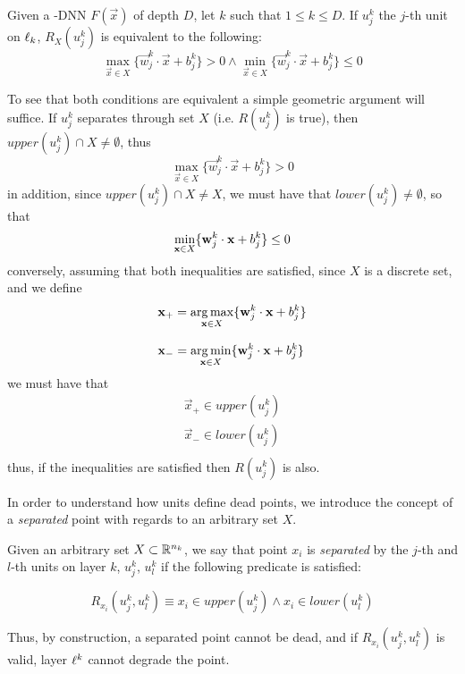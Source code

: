 \begin{remark}\label{rmk:separationUsingGeometry}
Given a \ReLU-DNN $F(\vec{x})$ of depth $D$, let $k$ such that $1\leq k \leq D$. If $u_j^k$ the $j$-th unit on $\layer_k$, $R_X(u_j^k)$ is equivalent to the following:
\begin{equation}
\displaystyle\max_{\vec{x}\in X}\{\vec{w}_j^k\cdot\vec{x}+b_j^k\} > 0
\wedge 
\displaystyle\min_{\vec{x}\in X}\{\vec{w}_j^k\cdot\vec{x}+b_j^k\} \leq 0
\end{equation}
\end{remark}
To see that both conditions are equivalent a simple geometric argument will suffice. If $u_j^k$ separates through set $X$ (i.e. $R(u_j^k)$ is true), then $upper(u_j^k)\cap X\neq\emptyset$, thus 
\begin{equation}
    \max_{\vec{x}\in X}\{\vec{w}_j^k\cdot\vec{x}+b_j^k\} > 0
\end{equation}
in addition, since $upper(u_j^k)\cap X\neq X$, we must have that $lower(u_j^k)\neq \emptyset$, so that 
\begin{equation}
 \displaystyle\min_{\vec{x}\in X}\{\vec{w}_j^k\cdot\vec{x}+b_j^k\} \leq 0\\     
\end{equation}
conversely, assuming that both inequalities are satisfied, since $X$ is a discrete set, and we define 
\begin{equation}
\begin{array}{l}
    \vec{x}_{+} = \displaystyle\argmax_{\vec{x}\in X}\{\vec{w}_j^k\cdot\vec{x}+b_j^k\}\\\\
    \vec{x}_{-} = \displaystyle\argmin_{\vec{x}\in X}\{\vec{w}_j^k\cdot\vec{x}+b_j^k\}\\
\end{array}
\end{equation}
we must have that 
\begin{equation}
\begin{array}{l}
 \vec{x}_{+}\in upper(u_j^k)\\
 \vec{x}_{-}\in lower(u_j^k)\\
 \end{array}
\end{equation} 
thus, if the inequalities are satisfied then $R(u_j^k)$ is also. 

In order to understand how units define dead points, we introduce the concept of a \emph{separated} point with regards to an arbitrary set $X$. 
\begin{definition}\label{def:separatingPoint}
Given an arbitrary set $X\subset\Real{n_k}$, we say that point $x_i$ is \emph{separated} by the $j$-th and $l$-th units on layer $k$, $u_j^k$, $u_l^k$ if the following predicate is satisfied:

\begin{equation}\label{eq:pointPredicate}
    R_{x_i}(u_j^k, u_l^k)\equiv x_i \in upper(u_j^k) \wedge x_i \in lower(u_l^k)
\end{equation}
\end{definition}

Thus, by construction, a separated point cannot be dead, and if $R_{x_i}(u_j^k, u_l^k)$ is valid, layer $\layer^k$ cannot degrade the point. 
\\\\

 